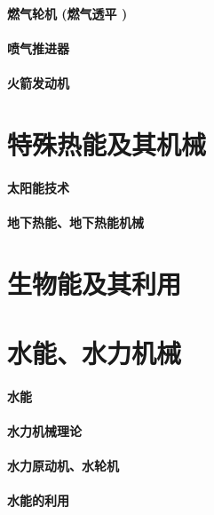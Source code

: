 \documentclass[UTF8]{../../ApplicationUniverse}
\begin{document}
\subsubsection{燃气轮机 (燃气透平 )}
\subsubsection{喷气推进器}
\subsubsection{火箭发动机}







\chapter{特殊热能及其机械}
\subsubsection{太阳能技术}
\subsubsection{地下热能、地下热能机械}






\chapter{生物能及其利用}







\chapter{水能、水力机械}
\subsubsection{水能}
\subsubsection{水力机械理论}
\subsubsection{水力原动机、水轮机}
\subsubsection{水能的利用}
\end{document}

